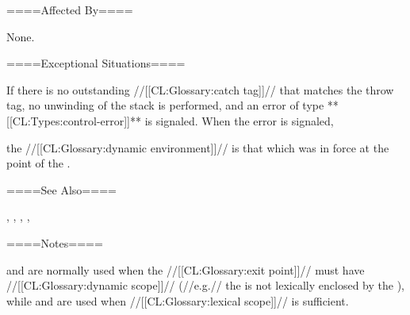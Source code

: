 ====Affected By====

None.

====Exceptional Situations====

If there is no outstanding //[[CL:Glossary:catch tag]]// that matches the throw tag, no unwinding of the stack is performed, and an error of type **[[CL:Types:control-error]]** is signaled. When the error is signaled,

the //[[CL:Glossary:dynamic environment]]// is that which was in force at the point of the .

====See Also====

, , , , {\secref\Evaluation}

====Notes====

 and  are normally used when the //[[CL:Glossary:exit point]]// must have //[[CL:Glossary:dynamic scope]]// (//e.g.// the  is not lexically enclosed by the ), while  and  are used when //[[CL:Glossary:lexical scope]]// is sufficient.

